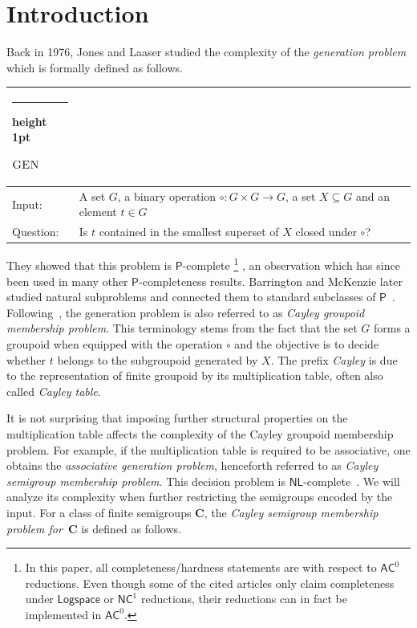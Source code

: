 \documentclass{toc}
\makeatletter
\newcommand{\AC}{\ensuremath{\mathsf{AC}}}
\newcommand{\NC}{\ensuremath{\mathsf{NC}}}
\newcommand{\PTIME}{\ensuremath{\mathsf{P}}}
\newcommand{\LOGSPACE}{\ensuremath{\mathsf{Logspace}}}
\newcommand{\NL}{\ensuremath{\mathsf{NL}}}
\newcommand{\vC}{\mathbf{C}}
\newcommand{\GEN}{\ensuremath{\textsc{GEN}}}
\newcommand{\SCGM}{Cayley groupoid membership}
\newcommand{\SCSM}{Cayley semigroup membership}
\newcommand{\SCGMP}{{\SCGM} problem}
\newcommand{\SCSMP}{{\SCSM} problem}
\newcommand{\thickhline}{%
    \noalign {\ifnum 0=`}\fi \hrule height 1pt
    \futurelet \reserved@a \@xhline
}
\makeatother
\begin{document}
\section{Introduction}

Back in 1976, Jones and Laaser studied the complexity of the \emph{generation
problem} which is formally defined as follows.
\vspace{1em}

\noindent
\begin{tabularx}{\textwidth}{p{1.25cm}X}
  \thickhline
  $\GEN$ \\
  \hline
  \textsf{Input}: & A set $G$, a binary operation $\circ \colon G \times G \to G$, a set $X \subseteq G$ and an element $t \in G$ \\
  \textsf{Question}: & Is $t$ contained in the smallest
superset   %
of $X$ closed under $\circ$? \\
  \hline
\end{tabularx}
\vspace{1ex}

They showed that this problem is $\PTIME$-complete%
%
%
%
%
\footnote{In this paper, all completeness/hardness statements
are with respect to $\AC^0$ reductions.  Even though some of the
cited articles only claim completeness under $\LOGSPACE$ or $\NC^1$
reductions, their reductions can in fact be implemented in $\AC^0$.} %
\cite{JonesL76}, an observation which has since been used in many 
other $\PTIME$-completeness results.
%
Barrington and McKenzie later studied natural subproblems and connected them to
standard subclasses of $\PTIME$~\cite{BarringtonM91}.
%
Following~\cite{BarringtonKLM01}, the generation problem is also referred to as
\emph{\SCGMP}.
%
This terminology stems from the fact that the set $G$ forms a groupoid when
equipped with the operation $\circ$ and the objective is to decide whether $t$
belongs to the subgroupoid generated by $X$.
%
The prefix \emph{Cayley} is due to the representation of finite groupoid by its
multiplication table, often also called \emph{Cayley table}.

It is not surprising that imposing further structural properties on the
multiplication table affects the complexity of the {\SCGMP}.
%
For example, if the multiplication table is required to be associative, one
obtains the \emph{associative generation problem}, henceforth referred to as
\emph{\SCSMP}.
%
This decision problem is $\NL$-complete~\cite{JonesLL76}.
%
We will analyze its complexity when further restricting the semigroups encoded
by the input.
%
For a class of finite semigroups $\vC$, the \emph{{\SCSMP} for~$\vC$} is
defined as follows.
\vspace{1em}
\end{document}
